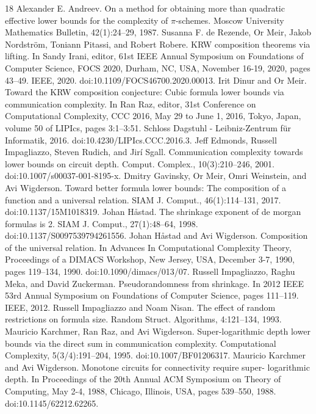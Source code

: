 \begin{thebibliography}{18}
 Alexander E. Andreev. On a method for obtaining more than quadratic effective lower bounds for the complexity of $\pi$-schemes. Moscow University Mathematics Bulletin, 42(1):24–29, 1987.
 Susanna F. de Rezende, Or Meir, Jakob Nordström, Toniann Pitassi, and Robert Robere. KRW composition theorems via lifting. In Sandy Irani, editor, 61st IEEE Annual Symposium on Foundations of Computer Science, FOCS 2020, Durham, NC, USA, November 16-19, 2020, pages 43–49. IEEE, 2020. doi:10.1109/FOCS46700.2020.00013.
 Irit Dinur and Or Meir. Toward the KRW composition conjecture: Cubic formula lower bounds via communication complexity. In Ran Raz, editor, 31st Conference on Computational Complexity, CCC 2016, May 29 to June 1, 2016, Tokyo, Japan, volume 50 of LIPIcs, pages 3:1–3:51. Schloss Dagstuhl - Leibniz-Zentrum für Informatik, 2016. doi:10.4230/LIPIcs.CCC.2016.3.
 Jeff Edmonds, Russell Impagliazzo, Steven Rudich, and Jirí Sgall. Communication complexity towards lower bounds on circuit depth. Comput. Complex., 10(3):210–246, 2001. doi:10.1007/s00037-001-8195-x.
 Dmitry Gavinsky, Or Meir, Omri Weinstein, and Avi Wigderson. Toward better formula lower bounds: The composition of a function and a universal relation. SIAM J. Comput., 46(1):114–131, 2017. doi:10.1137/15M1018319.
 Johan Håstad. The shrinkage exponent of de morgan formulas is 2. SIAM J. Comput., 27(1):48–64, 1998. doi:10.1137/S0097539794261556.
 Johan Håstad and Avi Wigderson. Composition of the universal relation. In Advances In Computational Complexity Theory, Proceedings of a DIMACS Workshop, New Jersey, USA, December 3-7, 1990, pages 119–134, 1990. doi:10.1090/dimacs/013/07.
 Russell Impagliazzo, Raghu Meka, and David Zuckerman. Pseudorandomness from shrinkage. In 2012 IEEE 53rd Annual Symposium on Foundations of Computer Science, pages 111–119. IEEE, 2012.
 Russell Impagliazzo and Noam Nisan. The effect of random restrictions on formula size. Random Struct. Algorithms, 4:121–134, 1993.
 Mauricio Karchmer, Ran Raz, and Avi Wigderson. Super-logarithmic depth lower bounds via the direct sum in communication complexity. Computational Complexity, 5(3/4):191–204, 1995. doi:10.1007/BF01206317.
 Mauricio Karchmer and Avi Wigderson. Monotone circuits for connectivity require super- logarithmic depth. In Proceedings of the 20th Annual ACM Symposium on Theory of Computing, May 2-4, 1988, Chicago, Illinois, USA, pages 539–550, 1988. doi:10.1145/62212.62265.

\end{thebibliography}
